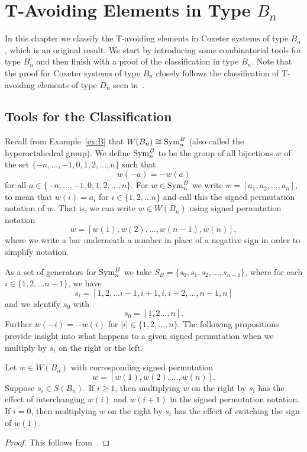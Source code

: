 \chapter{T-Avoiding Elements in Type $B_n$}\label{chap:BnandCn}

In this chapter we classify the T-avoiding elements in Coxeter systems of type $B_n$, which is an original result. We start by introducing some combinatorial tools for type $B_n$ and then finish with a proof of the classification in type $B_n$. Note that the proof for Coxeter systems of type $B_n$ closely follows the classification of T-avoiding elements of type $D_n$ seen in~\cite{Gern2013a}. 

\section{Tools for the Classification}\label{sec:Btools}

Recall from Example~\ref{ex:B} that $W(B_n) \cong \mathrm{Sym}_n^B$ (also called the hyperoctahedral group). We define $\mathrm{Sym}_n^B$ to be the group of all bijections $w$ of the set $\{-n, \ldots, -1, 0, 1, 2, \ldots, n\}$ such that 
\[w(-a)=-w(a)\] for all $a \in \{-n, \ldots, -1, 0, 1, 2, \ldots, n\}$. For $w \in \mathrm{Sym}_n^B$ we write $w=[a_1, a_2, \ldots, a_n]$, to mean that $w(i)=a_i$ for $i \in \{1,2, \ldots n\}$ and call this the signed permutation notation of $w$. That is, we can write $w \in W(B_n)$ using signed permutation notation 
\[ w=[w(1),w(2), \ldots, w(n-1), w(n)], \]
where we write a bar underneath a number in place of a negative sign in order to simplify notation. 

As a set of generators for $\mathrm{Sym}_n^B$ we take $S_B=\{s_0,s_1,s_2, \ldots, s_{n-1}\}$, where for each $i \in \{1,2,\ldots n-1\}$, we have
\[s_i=[1,2, \ldots i-1, i+1,i,i+2, \ldots, n-1,n] \] and we identify $s_0$ with
\[s_0=[\underline{1}, 2 \ldots, n].\] Further $w(-i)=-w(i)$ for $|i| \in \{1,2, \ldots, n\}$. The following propositions provide insight into what happens to a given signed permutation when we multiply by $s_i$ on the right or the left.

\begin{proposition}
	Let $w \in W(B_n)$ with corresponding signed permutation 
	\[w=[w(1),w(2), \ldots ,w(n)].\] Suppose $s_i \in S(B_n)$. If $i \geq 1$, then multiplying $w$ on the right by $s_i$ has the effect of interchanging $w(i)$ and $w(i+1)$ in  the signed permutation notation. If $i=0$, then multiplying $w$ on the right by $s_i$ has the effect of switching the sign of $w(1)$. 	
	\begin{proof}
	This follows from~\cite[Section 8.1 and A3.1]{Bjorner2005}.	
	\end{proof}
\end{proposition}

